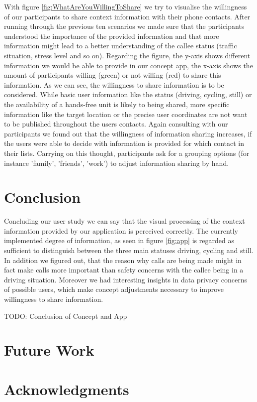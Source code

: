 \documentclass{sigchi}
\begin{document}
With figure \ref{fig:WhatAreYouWillingToShare} we try to visualise the willingness of our participants to share context information with their phone contacts. After running through the previous ten scenarios we made sure that the participants understood the importance of the provided information and that more information might lead to a better understanding of the callee status (traffic situation, stress level and so on). Regarding the figure, the y-axis shows different information we would be able to provide in our concept app, the x-axis shows the amount of participants willing (green) or not willing (red) to share this information. As we can see, the willingness to share information is to be considered. While basic user information like the status (driving, cycling, still) or the availability of a hands-free unit is likely to being shared, more specific information like the target location or the precise user coordinates are not want to be published throughout the users contacts. Again consulting with our participants we found out that the willingness of information sharing increases, if the users were able to decide with information is provided for which contact in their lists. Carrying on this thought, participants ask for a grouping options (for instance 'family', 'friends', 'work') to adjust information sharing by hand.


\section{Conclusion}
Concluding our user study we can say that the visual processing of the context information provided by our application is perceived correctly. The currently implemented degree of information, as seen in figure \ref{fig:app} is regarded as sufficient to distinguish between the three main statuses driving, cycling and still. In addition we figured out, that the reason why calls are being made might in fact make calls more important than safety concerns with the callee being in a driving situation. Moreover we had interesting insights in data privacy concerns of possible users, which make concept adjustments necessary to improve willingness to share information.

TODO: Conclusion of Concept and App

\section{Future Work}


\section{Acknowledgments}
\end{document}
